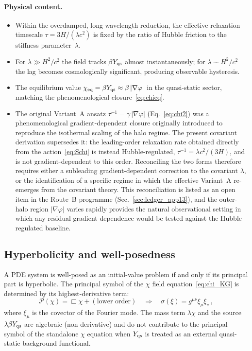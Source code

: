 \documentclass[11pt]{article}
\begin{document}
\paragraph{Physical content.}
\begin{itemize}
\item Within the overdamped, long-wavelength reduction,
  the effective relaxation timescale
  $\tau = 3H/(\lambda c^2)$ is fixed by the ratio of
  Hubble friction to the stiffness parameter~$\lambda$.
\item For $\lambda \gg H^2/c^2$ the field tracks $\beta Y_{\rm qs}$
  almost instantaneously; for $\lambda \sim H^2/c^2$
  the lag becomes cosmologically significant, producing
  observable hysteresis.
\item The equilibrium value $\chi_{\rm eq} = \beta Y_{\rm qs}
  \approx \beta\,|\nabla\varphi|$ in the quasi-static
  sector, matching the phenomenological
  closure~\eqref{eq:chieq}.
\item The original Variant~A ansatz
  $\tau^{-1} = \gamma\,|\nabla\varphi|$
  (Eq.~\ref{eq:chi2}) was a phenomenological
  gradient-dependent closure originally introduced to
  reproduce the isothermal scaling of the halo regime.
  The present covariant derivation supersedes it: the
  leading-order relaxation rate obtained directly from
  the action~\eqref{eq:Schi} is instead
  Hubble-regulated, $\tau^{-1}=\lambda c^2/(3H)$, and
  is not gradient-dependent to this order.
  Reconciling the two forms therefore requires either
  a subleading gradient-dependent correction to the
  covariant $\lambda$, or the identification of a
  specific regime in which the effective Variant~A
  re-emerges from the covariant theory.  This
  reconciliation is listed as an open item in the
  Route~B programme (Sec.~\ref{sec:ledger_app13}),
  and the outer-halo region $|\nabla\varphi|$ varies
  rapidly provides the natural observational setting
  in which any residual gradient dependence would be
  tested against the Hubble-regulated baseline.
\end{itemize}

\subsection{Hyperbolicity and well-posedness}\label{sec:wellposed}
A PDE system is well-posed as an initial-value problem
if and only if its principal part is hyperbolic.
The principal symbol of the $\chi$ field
equation~\eqref{eq:chi_KG} is determined by its
highest-derivative term:
\begin{equation}
\mathcal{P}(\chi) = \Box\chi + (\text{lower order})
\quad\Longrightarrow\quad
\sigma(\xi) = g^{\mu\nu}\xi_\mu\xi_\nu\,,
\label{eq:principal_app13}
\end{equation}
where $\xi_\mu$ is the covector of the Fourier mode.
The mass term $\lambda\chi$ and the source $\lambda\beta Y_{\rm qs}$
are algebraic (non-derivative) and do not contribute
to the principal symbol of the standalone $\chi$ equation when
$Y_{\rm qs}$ is treated as an external quasi-static background
functional.
\end{document}
